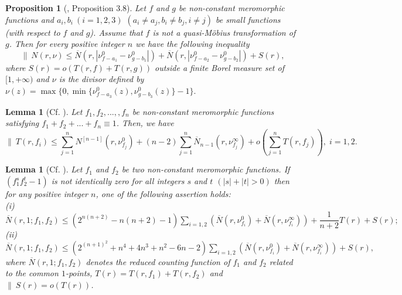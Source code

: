 \documentclass[12pt,leqno]{amsart}
\newtheorem{lemma}[equation]{Lemma}
\newtheorem{proposition}[equation]{Proposition}
\numberwithin{equation}{section}
\begin{document}
\begin{proposition}[\cite{QA}, Proposition 3.8]\label{2.2}
Let $f$ and $g$ be non-constant meromorphic functions and $a_i,b_i\ (i=1,2,3)$ $ (a_i\ne a_j, b_i\ne b_j, i\ne j)$ be small functions (with respect to $f$ and $g$). Assume that $f$ is not a quasi-M\"{o}bius transformation of $g$. Then for every positive integer $n$ we have the following inequality
$$\|\  N(r,\nu)\le \overline N(r,|\nu^0_{f-a_1}-\nu^0_{g-b_1}|)+\overline N(r,|\nu^0_{f-a_2}-\nu^0_{g-b_2}|)+S(r), $$
where $S(r)=o(T(r,f)+T(r,g))$ outside a finite Borel measure set of $[1,+\infty)$ and $\nu$ is the divisor defined by 
$\nu (z)=\max\{0,\min\{\nu^0_{f-a_3}(z),\nu^0_{g-b_3}(z)\}-1\}.$
\end{proposition}

\begin{lemma}[{Cf. \cite{LY95}}]\label{2.3}
Let $f_1,f_2, ...,, f_n$ be non-constant meromorphic functions satisfying $f_1+f_2+...+f_n\equiv 1$. Then, we have
$$\|\ T(r,f_i)\le\sum_{j=1}^{n}N^{[n-1]}(r,\nu^0_{f_j})+(n-2)\sum_{j=1}^{n}\overline N_{n-1}\left(r,\nu^{\infty}_{f_j}\right )+o(\sum_{j=1}^{n}T(r,f_j)),\; i=1,2.$$
\end{lemma}

\begin{lemma}[{Cf. \cite[Lemma 3.2]{QK}}]\label{2.4}
Let $f_1$ and $f_2$ be two non-constant meromorphic functions. If $(f_1^sf_2^t-1)$ is not identically zero for all integers $s$ and $t$ $(|s|+|t|>0)$ then for any positive integer $n$, one of the following assertion holds:\\
(i) $\overline N(r,1;f_1,f_2)\leq (2^{n(n+2)}-n(n+2)-1)\sum_{i=1,2}\left(\overline N(r,\nu^0_{f_i})+\overline N(r,\nu^\infty_{f_i})\right)+\dfrac{1}{n+2}T(r)+S(r);$\\
(ii) $\overline N(r,1;f_1,f_2)\leq (2^{(n+1)^2}+n^4+4n^3+n^2-6n-2)\sum_{i=1,2}\left(\overline N(r,\nu^0_{f_i})+\overline N(r,\nu^\infty_{f_i})\right)+S(r),$\\
where $\overline N(r,1;f_1,f_2)$ denotes the reduced counting function of $f_1$ and $f_2$ related to the common $1$-points, $T(r)=T(r,f_1)+T(r,f_2)$ and $\|\ S(r)=o(T(r))$.
\end{lemma}
\end{document}
